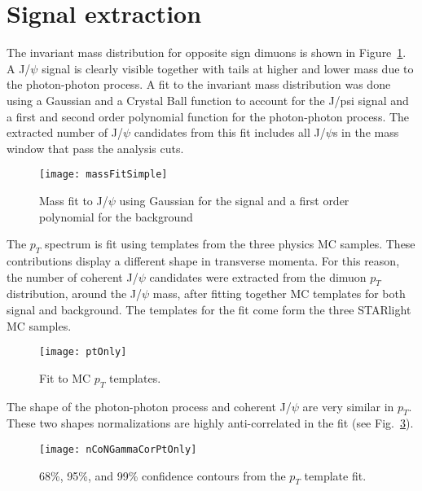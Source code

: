   \section{\label{sec:sigEx} Signal extraction}
    The invariant mass distribution for opposite sign dimuons is shown in 
      Figure~\ref{fig:massFit}. 
    A J/$\psi$ signal is clearly visible together with tails at higher and lower 
      mass due to the photon-photon process.
    A fit to the invariant mass distribution was done using a Gaussian and a 
      Crystal Ball function to account for the J/psi signal and a first and 
      second order polynomial function for the photon-photon process.
    The extracted number of J/$\psi$ candidates from this fit includes all 
      J/$\psi$s in the mass window that pass the analysis cuts.

    \begin{figure}[!Hhtb]
      \centering
      \texttt{[image: massFitSimple]}
      \caption{Mass fit to J/$\psi$ using Gaussian for the 
        signal and a first order polynomial for the background}
      \label{fig:massFit}
    \end{figure}
   
    The $p_{T}$ spectrum is fit using templates from the three physics MC 
      samples. 
    These contributions display a different shape in transverse momenta. 
    For this reason, the number of coherent J/$\psi$ candidates were extracted 
      from the dimuon $p_{T}$ distribution, around the J/$\psi$ mass, 
      after fitting together MC templates for both signal and background.
    The templates for the fit come form the three STARlight MC samples. 

    \begin{figure}[!Hhbt]
      \centering
      \texttt{[image: ptOnly]}
      \caption{ Fit to MC $p_{T}$ templates. }
      \label{fig:ptTemps}
    \end{figure}

    The shape of the photon-photon process and coherent J/$\psi$ are very 
      similar in $p_{T}$.
    These two shapes normalizations are highly anti-correlated in the fit 
      (see Fig.~\ref{fig:ptOnlyCor}).

    \begin{figure}[!Hhbt]
      \centering
      \texttt{[image: nCoNGammaCorPtOnly]}
      \caption{68\%, 95\%, and 99\% confidence contours from the $p_{T}$ 
        template fit. }
      \label{fig:ptOnlyCor}
    \end{figure}

